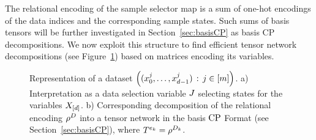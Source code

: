 The relational encoding of the sample selector map is a sum of one-hot encodings of the data indices and the corresponding sample states.
Such sums of basis tensors will be further investigated in Section~\ref{sec:basisCP} as basis CP decompositions.
We now exploit this structure to find efficient tensor network decompositions (see Figure~\ref{fig:DataDecomposition}) based on matrices encoding its variables.


\begin{figure}[h]
\begin{center}
	
\end{center}
\caption{
	Representation of a dataset $\left(({x_{0}^{j},\ldots,x_{d-1}^{j}})\,:\,j\in[m]\right)$.
	a) Interpretation as a data selection variable $J$ selecting states for the variables $X_{[d]}$.
	b) Corresponding decomposition of the relational encoding $\rho^{D}$ into a tensor network in the basis $\mathrm{CP}$ Format (see Section~\ref{sec:basisCP}), where $T^{e_{k}}=\rho^{D_{k}}$.
}
\label{fig:DataDecomposition}
\end{figure}


